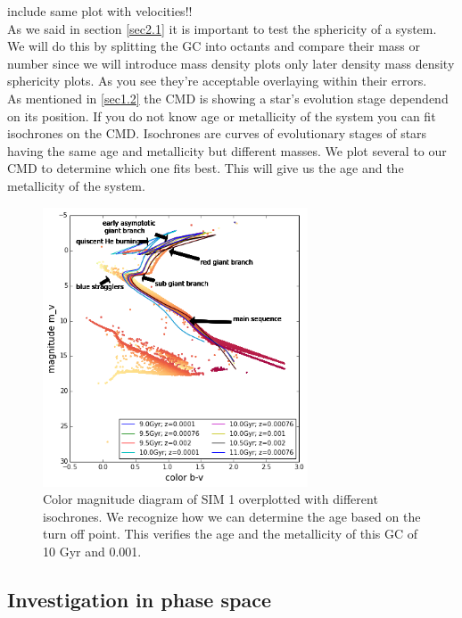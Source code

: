 \color{red} include same plot with velocities!! \color{black}\\
As we said in section \ref{sec2.1} it is important to test the sphericity of a system. We will do this by splitting the \ac{GC} into octants and compare their mass \color{red} or number since we will introduce mass density plots only later \color{black} density \color{red} mass density sphericity plots\color{black}. As you see they're acceptable overlaying \color{red} within their errors. \color{black}
\\
As mentioned in \ref{sec1.2} the \ac{CMD} is showing a star's evolution stage dependend on its position. If you do not know age or metallicity of the system you can fit isochrones on the \ac{CMD}. Isochrones are curves of evolutionary stages of stars having the same age and metallicity but different masses. We plot several to our \ac{CMD} to determine which one fits best. This will give us the age and the metallicity of the system. 
\begin{figure}
\centering
\includegraphics[width=0.7\textwidth]{Plots/cmd_isochrones}
\caption{Color magnitude diagram of SIM 1 overplotted with different isochrones. We recognize how we can determine the age based on the turn off point. This verifies the age and the metallicity of this \ac{GC} of 10 Gyr and 0.001.}
	\label{fig:cmd_isochrones}
\end{figure}


\subsection{Investigation in phase space}

